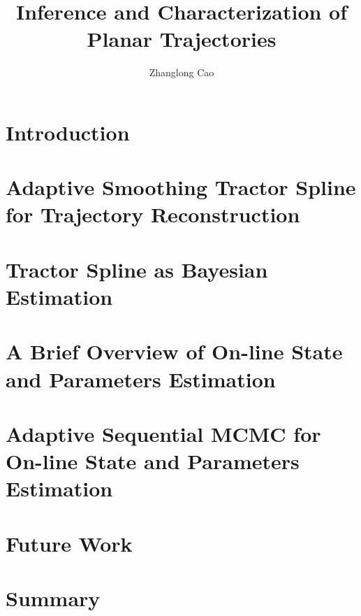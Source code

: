 \documentclass[12pt,twoside]{report}
\title{Inference and Characterization of Planar Trajectories}
\author{Zhanglong Cao}
\date{}
\begin{document}
\frontstuff

\linespread{1.3} \normalsize


\chapter{Introduction}\label{ChapterIntro}

\clearemptydoublepage

\chapter{Adaptive Smoothing Tractor Spline for Trajectory Reconstruction}\label{ChapterTS}

\clearemptydoublepage

\chapter{Tractor Spline as Bayesian Estimation}\label{ChapterGPR}

\clearemptydoublepage

\chapter{A Brief Overview of On-line State and Parameters Estimation}\label{ChapterFR}

\clearemptydoublepage

\chapter{Adaptive Sequential MCMC for On-line State and Parameters Estimation}\label{ChapterMCMC}

\clearemptydoublepage

%


\chapter{Future Work}\label{ChapterFuture}

\clearemptydoublepage


\chapter{Summary}\label{ChapterSummary}

\clearemptydoublepage
\end{document}
